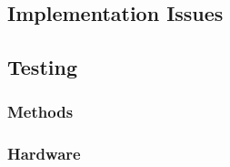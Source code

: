 \documentclass[12pt]{report}
\begin{document}
\subsection{Implementation Issues}
\subsection{Testing}
\subsubsection{Methods}
\subsubsection{Hardware}


\end{document}
